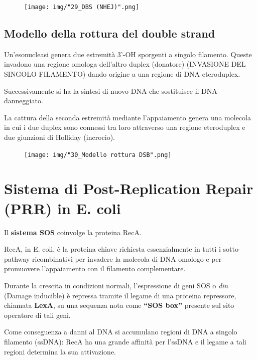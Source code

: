 \documentclass[11pt]{book}
\begin{document}
\begin{figure}[htp]
\centering
\texttt{[image: img/"29\_DBS (NHEJ)".png]}
\caption{}
\label{}
\end{figure}

\clearpage

\subsection{Modello della rottura del double
strand}\label{modello-della-rottura-del-double-strand}

Un'esonucleasi genera due estremità 3'-OH sporgenti a singolo filamento.
Queste invadono una regione omologa dell'altro duplex (donatore)
(INVASIONE DEL SINGOLO FILAMENTO) dando origine a una regione di DNA
eteroduplex.

Successivamente si ha la sintesi di nuovo DNA che sostituisce il DNA
danneggiato.

La cattura della seconda estremità mediante l'appaiamento genera una
molecola in cui i due duplex sono connessi tra loro attraverso una
regione eteroduplex e due giunzioni di Holliday (incrocio).

\clearpage

\begin{figure}[htp]
\centering
\texttt{[image: img/"30\_Modello rottura DSB".png]}
\caption{}
\label{modello-rottura-dsb}
\end{figure}

\clearpage

\section{Sistema di Post-Replication Repair (PRR) in E.
coli}\label{sistema-di-post-replication-repair-prr-in-e.-coli}

Il \textbf{sistema SOS} coinvolge la proteina RecA.

RecA, in E. coli, è la proteina chiave richiesta essenzialmente in
tutti i sotto-pathway ricombinativi per invadere la molecola di DNA
omologo e per promuovere l'appaiamento con il filamento complementare.

Durante la crescita in condizioni normali, l'espressione di geni SOS o
\emph{din} (Damage inducible) è repressa tramite il legame di una
proteina repressore, chiamata \textbf{LexA}, su una sequenza nota come
\textbf{``SOS box''} presente sul sito operatore di tali geni.

Come conseguenza a danni al DNA si accumulano regioni di DNA a singolo
filamento (ssDNA): RecA ha una grande affinità per l'ssDNA e il legame a
tali regioni determina la sua attivazione.
\end{document}
